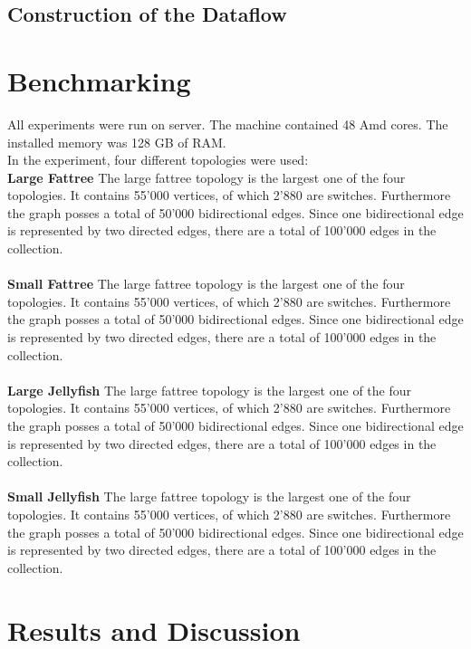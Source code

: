 \documentclass[11pt,singlecolumn]{scrartcl}
\begin{document}
\subsection{Construction of the Dataflow}

\clearpage



\section{Benchmarking}
All experiments were run on server. The machine contained 48 Amd cores. The installed memory was 128 GB of RAM.\\
In the experiment, four different topologies were used:\\
\textbf{Large Fattree}  The large fattree topology is the largest one of the four topologies. It contains 55'000 vertices, of which 2'880 are switches. Furthermore the graph posses a total of 50'000 bidirectional edges. Since one bidirectional edge is represented by two directed edges, there are a total of 100'000 edges in the collection.\\\\
\textbf{Small Fattree}  The large fattree topology is the largest one of the four topologies. It contains 55'000 vertices, of which 2'880 are switches. Furthermore the graph posses a total of 50'000 bidirectional edges. Since one bidirectional edge is represented by two directed edges, there are a total of 100'000 edges in the collection.\\\\
\textbf{Large Jellyfish}  The large fattree topology is the largest one of the four topologies. It contains 55'000 vertices, of which 2'880 are switches. Furthermore the graph posses a total of 50'000 bidirectional edges. Since one bidirectional edge is represented by two directed edges, there are a total of 100'000 edges in the collection.\\\\
\textbf{Small Jellyfish}  The large fattree topology is the largest one of the four topologies. It contains 55'000 vertices, of which 2'880 are switches. Furthermore the graph posses a total of 50'000 bidirectional edges. Since one bidirectional edge is represented by two directed edges, there are a total of 100'000 edges in the collection.
\clearpage


\section{Results and Discussion}
\end{document}
